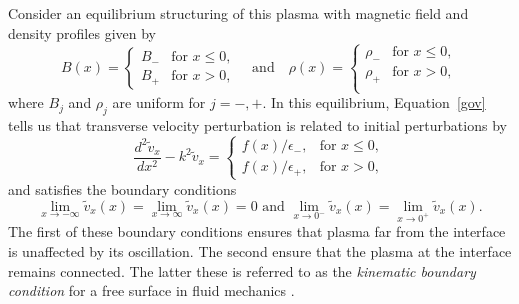 Consider an equilibrium structuring of this plasma with magnetic field and density profiles given by
\begin{equation}
B(x)=
\begin{cases}
B_- & \text{for  }x \leq 0, \\
B_+ & \text{for  }x > 0,
\end{cases}
\quad \text{and} \quad
\rho(x)=
\begin{cases}
\rho_- & \text{for  }x \leq 0, \\
\rho_+ & \text{for  }x > 0, \\
\end{cases}
\end{equation}
where $B_j$ and $\rho_j$ are uniform for $j = -, +$. In this equilibrium, Equation~\eqref{gov} tells us that transverse velocity perturbation is related to initial perturbations by
\begin{equation}
\frac{d^2\tilde{v}_x}{dx^2} - k^2\tilde{v}_x = 
\begin{cases}
f(x)/\epsilon_-, & \text{for  } x \leq 0,\\
f(x)/\epsilon_+, & \text{for  } x > 0,
\end{cases}
\label{ivp interface gov}
\end{equation}
and satisfies the boundary conditions
\begin{equation}
\lim_{x \to -\infty}\tilde{v}_x(x) = \lim_{x \to \infty}\tilde{v}_x(x) = 0 \text{ and } \lim_{x \to 0^-}\tilde{v}_x(x) = \lim_{x \to 0^+}\tilde{v}_x(x).
\label{ivp interface BC}
\end{equation}
The first of these boundary conditions ensures that plasma far from the interface is unaffected by its oscillation. The second ensure that the plasma at the interface remains connected. The latter these is referred to as the \textit{kinematic boundary condition} for a free surface in fluid mechanics \citep{goe_etal04}.

